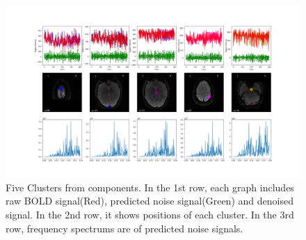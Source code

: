 \begin{figure}[htp]
  \centering
  \includegraphics[width=0.9\columnwidth]{Figures/clusters.png}
  \caption{Five Clusters from components. In the 1st row, each graph includes raw BOLD signal(Red), predicted noise signal(Green) and 
  denoised signal. In the 2nd row, it shows positions of each cluster. In the 3rd row, frequency spectrums are of predicted noise signals.}
  \label{fig:clusters}
\end{figure} 





